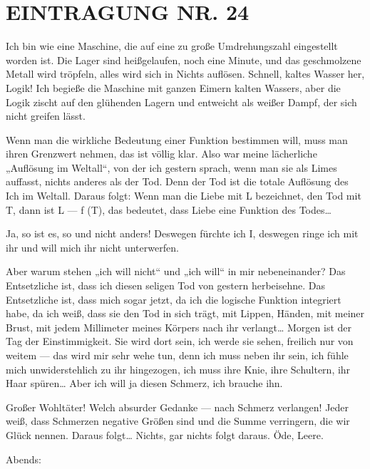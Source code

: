 \section{EINTRAGUNG NR. 24}

Ich bin wie eine Maschine, die auf eine zu große Umdrehungszahl
eingestellt worden ist. Die Lager sind heißgelaufen, noch eine
Minute, und das geschmolzene Metall wird tröpfeln, alles wird sich
in Nichts auflösen. Schnell, kaltes Wasser her, Logik! Ich begieße
die Maschine mit ganzen Eimern kalten Wassers, aber die Logik
zischt auf den glühenden Lagern und entweicht als weißer Dampf, der
sich nicht greifen lässt.

Wenn man die wirkliche Bedeutung einer Funktion bestimmen will,
muss man ihren Grenzwert nehmen, das ist völlig klar. Also war
meine lächerliche „Auflösung im Weltall“, von der ich gestern
sprach, wenn man sie als
Limes auffasst, nichts anderes als der Tod. Denn der Tod ist die
totale Auflösung des Ich im Weltall. Daraus folgt: Wenn man die
Liebe mit L bezeichnet, den Tod mit T, dann ist L — f (T), das
bedeutet, dass Liebe eine Funktion des Todes\ldots{}

Ja, so ist es, so und nicht anders! Deswegen fürchte ich I,
deswegen ringe ich mit ihr und will mich ihr nicht unterwerfen.

Aber warum stehen „ich will nicht“ und „ich will“ in mir
nebeneinander? Das Entsetzliche ist, dass ich diesen seligen Tod
von gestern herbeisehne. Das Entsetzliche ist, dass mich sogar
jetzt, da ich die logische Funktion integriert habe, da ich weiß,
dass sie den Tod in sich trägt, mit Lippen, Händen, mit meiner
Brust, mit jedem Millimeter meines Körpers nach ihr verlangt\ldots{}
Morgen ist der Tag der Einstimmigkeit. Sie wird dort sein, ich
werde sie sehen, freilich nur von weitem — das wird mir sehr wehe
tun, denn ich muss neben ihr sein, ich fühle mich unwiderstehlich
zu ihr hingezogen, ich muss ihre Knie, ihre Schultern, ihr Haar
spüren\ldots{} Aber ich will ja diesen Schmerz, ich brauche ihn.

Großer Wohltäter! Welch absurder Gedanke — nach Schmerz verlangen!
Jeder weiß, dass Schmerzen negative Größen sind und die Summe
verringern, die wir Glück nennen. Daraus folgt\ldots{} Nichts, gar
nichts folgt daraus. Öde, Leere.

Abends:

